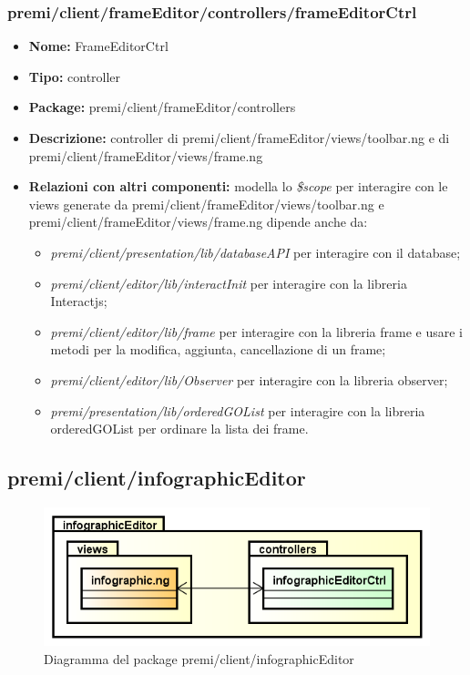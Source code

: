 \subsubsection{premi/client/frameEditor/controllers/frameEditorCtrl}
\begin{itemize}
  \item[] \textbf{Nome:} FrameEditorCtrl
  \item[] \textbf{Tipo:} controller
  \item[] \textbf{Package:} premi/client/frameEditor/controllers
  \item[] \textbf{Descrizione:} controller di premi/client/frameEditor/views/toolbar.ng e di premi/client/frameEditor/views/frame.ng
  \item[] \textbf{Relazioni con altri componenti:} modella lo \textit{\$scope} per interagire con le views generate da premi/client/frameEditor/views/toolbar.ng e premi/client/frameEditor/views/frame.ng dipende anche da:
 \begin{itemize} 
	\item \textit{premi/client/presentation/lib/databaseAPI} per interagire con il database;  
	\item \textit{premi/client/editor/lib/interactInit} per interagire con la libreria Interactjs;
	\item \textit{premi/client/editor/lib/frame} per interagire con la libreria frame e usare i metodi per la modifica, aggiunta, cancellazione di un frame;
	\item \textit{premi/client/editor/lib/Observer} per interagire con la libreria observer; 
	\item \textit{premi/presentation/lib/orderedGOList} per interagire con la libreria orderedGOList per ordinare la lista dei frame. 
  \end{itemize} 
\end{itemize}

\clearpage
\subsection{premi/client/infographicEditor}
\begin{figure}[!h]
\begin{center}
\includegraphics[scale=0.45]{img/diapkg/infographicEditor.png}
\caption{Diagramma del package premi/client/infographicEditor}
\end{center}
\end{figure}
